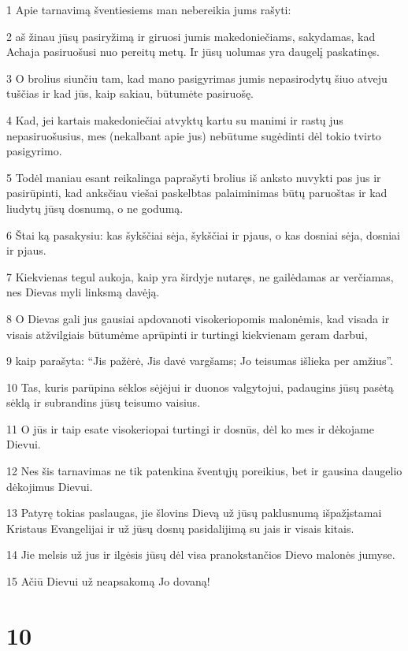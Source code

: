 \par 1 Apie tarnavimą šventiesiems man nebereikia jums rašyti: 
\par 2 aš žinau jūsų pasiryžimą ir giruosi jumis makedoniečiams, sakydamas, kad Achaja pasiruošusi nuo pereitų metų. Ir jūsų uolumas yra daugelį paskatinęs. 
\par 3 O brolius siunčiu tam, kad mano pasigyrimas jumis nepasirodytų šiuo atveju tuščias ir kad jūs, kaip sakiau, būtumėte pasiruošę. 
\par 4 Kad, jei kartais makedoniečiai atvyktų kartu su manimi ir rastų jus nepasiruošusius, mes (nekalbant apie jus) nebūtume sugėdinti dėl tokio tvirto pasigyrimo. 
\par 5 Todėl maniau esant reikalinga paprašyti brolius iš anksto nuvykti pas jus ir pasirūpinti, kad anksčiau viešai paskelbtas palaiminimas būtų paruoštas ir kad liudytų jūsų dosnumą, o ne godumą. 
\par 6 Štai ką pasakysiu: kas šykščiai sėja, šykščiai ir pjaus, o kas dosniai sėja, dosniai ir pjaus. 
\par 7 Kiekvienas tegul aukoja, kaip yra širdyje nutaręs, ne gailėdamas ar verčiamas, nes Dievas myli linksmą davėją. 
\par 8 O Dievas gali jus gausiai apdovanoti visokeriopomis malonėmis, kad visada ir visais atžvilgiais būtumėme aprūpinti ir turtingi kiekvienam geram darbui, 
\par 9 kaip parašyta: “Jis pažėrė, Jis davė vargšams; Jo teisumas išlieka per amžius”. 
\par 10 Tas, kuris parūpina sėklos sėjėjui ir duonos valgytojui, padaugins jūsų pasėtą sėklą ir subrandins jūsų teisumo vaisius. 
\par 11 O jūs ir taip esate visokeriopai turtingi ir dosnūs, dėl ko mes ir dėkojame Dievui. 
\par 12 Nes šis tarnavimas ne tik patenkina šventųjų poreikius, bet ir gausina daugelio dėkojimus Dievui. 
\par 13 Patyrę tokias paslaugas, jie šlovins Dievą už jūsų paklusnumą išpažįstamai Kristaus Evangelijai ir už jūsų dosnų pasidalijimą su jais ir visais kitais. 
\par 14 Jie melsis už jus ir ilgėsis jūsų dėl visa pranokstančios Dievo malonės jumyse. 
\par 15 Ačiū Dievui už neapsakomą Jo dovaną!


\chapter{10}


